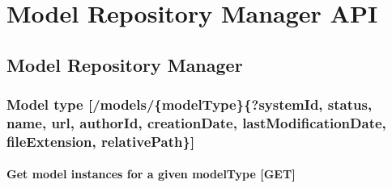 
\chapter{Model Repository Manager API} %

\label{ModelRepositoryManager} %

\section{Model Repository Manager}\label{model-repository-manager}

\subsection{Model type
{[}/models/\{modelType\}\{?systemId, status, name, url, authorId, creationDate, lastModificationDate, fileExtension, relativePath\}{]}}\label{model-type-modelsmodeltypesystemidstatusnameurlauthoridcreationdatelastmodificationdatefileextensionrelativepath}

\subsubsection{Get model instances for a given modelType
{[}GET{]}}\label{get-model-instances-for-a-given-modeltype-get}


